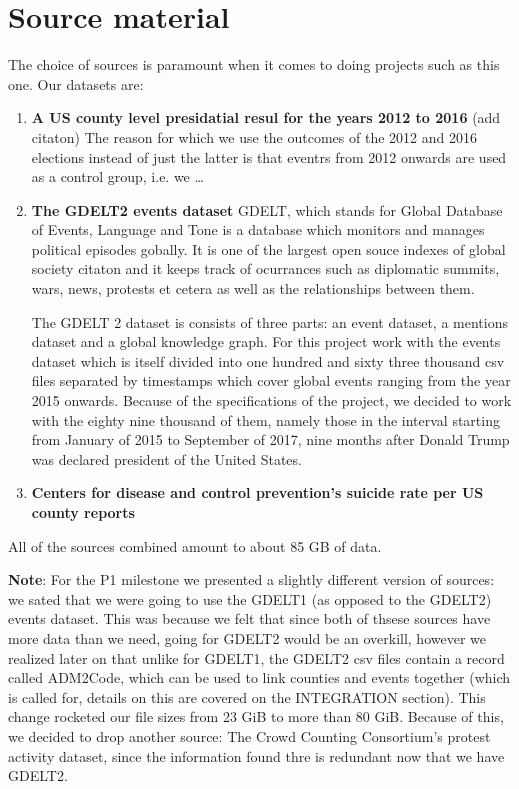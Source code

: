 \section{Source material}

The choice of sources is paramount when it comes to doing projects
such as this one. Our datasets are:
\begin{enumerate}
	\item \textbf{A US county level presidatial resul for the
		years 2012 to 2016}
		{\color{red}(add citaton)}
		The reason for which we use the outcomes
		of the 2012 and 2016 elections instead of just the latter
		is that eventrs from 2012 onwards are used as a
		control group, i.e. we \ldots

	\item \textbf{The GDELT2 events dataset}
		GDELT, which stands for Global Database of Events, Language
		and Tone is a database which monitors and manages
		political episodes gobally. It is one of the largest
		open souce indexes of global society {\color{red} citaton}
		and it keeps track of ocurrances
		such as diplomatic summits, wars, news, protests et
		cetera as well as the relationships between them.


		The GDELT 2 dataset is consists of three parts: an
		event dataset, a mentions dataset and a global knowledge
		graph. For this project work with the events dataset
		which is itself divided into one hundred and sixty three
		thousand csv files separated by timestamps which cover
		global events ranging from the year 2015 onwards.
		Because of the specifications of the project, we decided
		to work with the eighty nine thousand of them, namely
		those in the interval starting from January of 2015 to
		September of 2017, nine months after Donald Trump
		was declared president of the United States.

	\item \textbf{Centers for disease and control prevention's
		suicide rate per US county reports}

\end{enumerate}
All of the sources combined amount to about 85 GB of data.

\textbf{Note}: For the P1 milestone we presented a slightly
different version of sources: we sated that we were going to use
the GDELT1 (as opposed to the GDELT2) events dataset.
This was because we felt that since both of thsese sources have
more data than we need, going for GDELT2 would be an overkill,
however we realized later on that unlike for GDELT1,
the GDELT2 csv files contain a record called ADM2Code,
which can be used to link counties and events together
(which is called for, details on this are covered
on the INTEGRATION section).
This change rocketed our file sizes from 23 GiB to more than
80 GiB. Because of this, we decided to drop another source:
The Crowd Counting Consortium's protest activity dataset, since
the information found thre is redundant now that we have
GDELT2.
